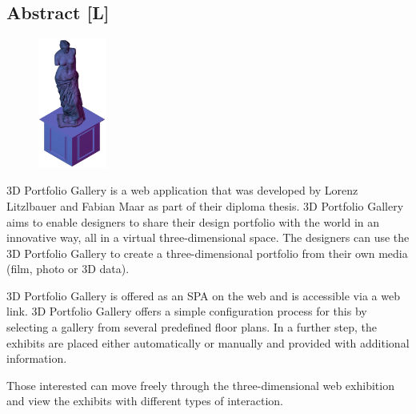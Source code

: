 \begin{spacing}{1}
    \chapter*{Abstract [L]}
\end{spacing}
\begin{figure}
    \begin{center}
      \includegraphics[width=0.2\textwidth]{pics/statue.png}
    \end{center}
\end{figure}
3D Portfolio Gallery is a web application that was developed by Lorenz Litzlbauer and Fabian Maar as part of their diploma thesis. 3D Portfolio Gallery aims to enable designers to share their design portfolio with the world in an innovative way, all in a virtual three-dimensional space. The designers can use the 3D Portfolio Gallery to create a three-dimensional portfolio from their own media (film, photo or 3D data).

3D Portfolio Gallery is offered as an SPA on the web and is accessible via a web link. 3D Portfolio Gallery offers a simple configuration process for this by selecting a gallery from several predefined floor plans. In a further step, the exhibits are placed either automatically or manually and provided with additional information.

Those interested can move freely through the three-dimensional
web exhibition and view the exhibits with different types of interaction.

